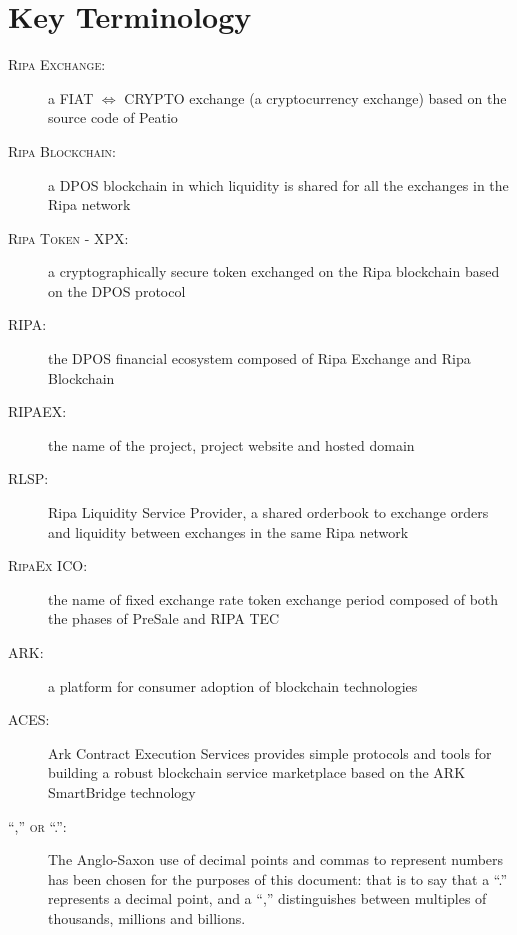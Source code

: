 \documentclass[11pt,fleqn]{book} %
\begin{document}
\section{Key Terminology}
	\begin{description}
		\item[\textsc{Ripa Exchange:}] a FIAT $\Leftrightarrow$ CRYPTO exchange (a cryptocurrency exchange) based on the source code
		of Peatio \cite{peatio}
		\item[\textsc{Ripa Blockchain:}] a DPOS blockchain in which liquidity is shared for all the exchanges in the Ripa network
		\item[\textsc{Ripa Token - XPX:}] a cryptographically secure token exchanged on the Ripa blockchain based on the DPOS protocol
		\item[\textsc{RIPA:}] the DPOS financial ecosystem composed of Ripa Exchange and Ripa Blockchain
		\item[\textsc{RIPAEX:}] the name of the project, project website and hosted domain
		\item[\textsc{RLSP:}] Ripa Liquidity Service Provider, a shared orderbook to exchange orders and liquidity between exchanges in the same Ripa network
		\item[\textsc{RipaEx ICO:}] the name of fixed exchange rate token exchange period composed of both the phases of PreSale and RIPA TEC
		\item[\textsc{ARK:}] a platform for consumer adoption of blockchain technologies \cite{ark}
		\item[\textsc{ACES:}] Ark Contract Execution Services \cite{aces} provides simple protocols and tools for building a robust 
		blockchain service marketplace based on the ARK SmartBridge technology
		\item[\textsc{``,'' or ``.'':}] The Anglo-Saxon use of decimal points and commas to represent numbers has
		been chosen for the purposes of this document: that is to say that a “.” represents a decimal point, and a “,”
		distinguishes between multiples of thousands, millions and billions.
    \end{description}

\end{document}
